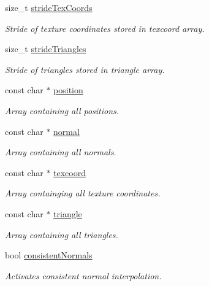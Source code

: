 \begin{DoxyCompactItemize}
size\_\-t \hyperlink{classembree_1_1_triangle_mesh_handle_a49aff40aa876ddc6474b257314cae841}{strideTexCoords}
\begin{DoxyCompactList}\small\item\em Stride of texture coordinates stored in texcoord array. \item\end{DoxyCompactList}\item 
size\_\-t \hyperlink{classembree_1_1_triangle_mesh_handle_ada71ff7f9d327215154981aa74506059}{strideTriangles}
\begin{DoxyCompactList}\small\item\em Stride of triangles stored in triangle array. \item\end{DoxyCompactList}\item 
const char $\ast$ \hyperlink{classembree_1_1_triangle_mesh_handle_abb14d6b2d49813d44cc7d6a65bcc7590}{position}
\begin{DoxyCompactList}\small\item\em Array containing all positions. \item\end{DoxyCompactList}\item 
const char $\ast$ \hyperlink{classembree_1_1_triangle_mesh_handle_ad4208d7cf617dbcba2a20f83ebb53ee4}{normal}
\begin{DoxyCompactList}\small\item\em Array containing all normals. \item\end{DoxyCompactList}\item 
const char $\ast$ \hyperlink{classembree_1_1_triangle_mesh_handle_ae7c3847e8558019d88ed1bf236d1589c}{texcoord}
\begin{DoxyCompactList}\small\item\em Array containging all texture coordinates. \item\end{DoxyCompactList}\item 
const char $\ast$ \hyperlink{classembree_1_1_triangle_mesh_handle_a8d27b047269688cfdadbb8088aa9430d}{triangle}
\begin{DoxyCompactList}\small\item\em Array containing all triangles. \item\end{DoxyCompactList}\item 
bool \hyperlink{classembree_1_1_triangle_mesh_handle_a3e42905ff0990a908bfdebdde756e002}{consistentNormals}
\begin{DoxyCompactList}\small\item\em Activates consistent normal interpolation. \item\end{DoxyCompactList}\end{DoxyCompactItemize}


